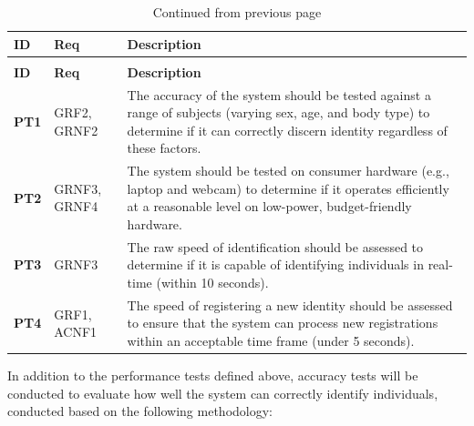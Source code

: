 \begin{scriptsize}
    \begin{longtable}{|p{}|p{}|p{}|}
        \caption{Performance Testing}
        \label{tab:performance-tests}                                                                                                                                                                                          \\
        \hline
        \textbf{ID}  & \textbf{Req} & \textbf{Description}                                                                                                                                                                     \\ \hline
        \endfirsthead
        \caption*{Continued from previous page}                                                                                                                                                                                \\
        \hline
        \textbf{ID}  & \textbf{Req} & \textbf{Description}                                                                                                                                                                     \\ \hline
        \endhead
        \hline
        \endfoot
        \textbf{PT1} & GRF2, GRNF2  & The accuracy of the system should be tested against a range of subjects (varying sex, age, and body type) to determine if it can correctly discern identity regardless of these factors. \\ \hline
        \textbf{PT2} & GRNF3, GRNF4 & The system should be tested on consumer hardware (e.g., laptop and webcam) to determine if it operates efficiently at a reasonable level on low-power, budget-friendly hardware.         \\ \hline
        \textbf{PT3} & GRNF3        & The raw speed of identification should be assessed to determine if it is capable of identifying individuals in real-time (within 10 seconds).                                            \\ \hline
        \textbf{PT4} & GRF1, ACNF1  & The speed of registering a new identity should be assessed to ensure that the system can process new registrations within an acceptable time frame (under 5 seconds).
    \end{longtable}
\end{scriptsize}

In addition to the performance tests defined above, accuracy tests will be conducted to evaluate how well the system can correctly identify individuals, conducted based on the following methodology:

